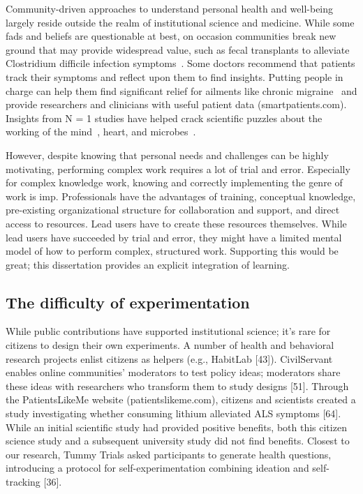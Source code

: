 Community-driven approaches to understand personal
health and well-being largely reside outside the realm
of institutional science and medicine. While some fads and beliefs are questionable at best, on occasion communities
break new ground that may provide widespread value,
such as fecal transplants to alleviate Clostridium difficile infection
symptoms~\cite{Brandt2012}. Some doctors recommend that patients
track their symptoms and reflect upon them to find
insights. Putting people in charge can help them find significant
relief for ailments like chronic migraine~\cite{Gawande2017} and provide
researchers and clinicians with useful patient data
(smartpatients.com). Insights from N = 1 studies have helped
crack scientific puzzles about the working of the mind~\cite{V.S.Ramachandran1998},
heart, and microbes~\cite{Weisse2012}. 

However, despite knowing that personal needs and challenges can be highly motivating, performing complex work requires a lot of trial and error. Especially for complex knowledge work, knowing and correctly implementing the genre of work is imp. 
Professionals have the advantages of training,
conceptual knowledge, pre-existing organizational structure for collaboration and support, and
direct access to resources. Lead users have to create these resources themselves. 
While lead users have succeeded by trial and error, they might have  a limited mental model of how to perform complex, structured work.  Supporting this would be great; this dissertation provides an explicit integration of learning.


\subsection {The difficulty of experimentation}
While public contributions have supported institutional science; it’s rare for citizens to design
their own experiments. A number of health and behavioral research projects enlist citizens as helpers (e.g., HabitLab [43]). 
CivilServant enables online communities’ 
moderators to test policy ideas; moderators share these ideas with researchers who transform 
them to study designs [51]. Through the PatientsLikeMe website (patientslikeme.com), citizens 
and scientists created a study investigating whether consuming lithium alleviated ALS symptoms [64]. 
While an initial scientific study had provided positive benefits, both this citizen science study and 
a subsequent university study did not find benefits. Closest to our research, Tummy Trials asked 
participants to generate health questions, introducing a protocol for self-experimentation 
combining ideation and self-tracking [36].

